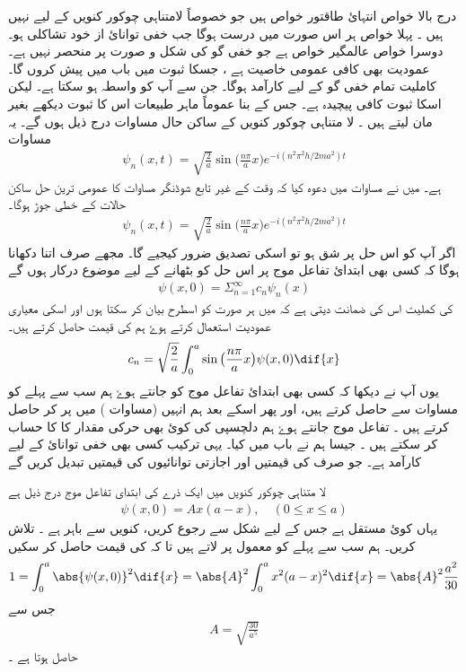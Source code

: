 درج بالا    خواص انتہائ طاقتور خواص ہیں جو خصوصاً لامتناہی چوکور کنویں کے لیے نہیں ہیں ۔ پہلا خواص ہر اس صورت میں درست ہوگا جب خفی توانائ از خود تشاکلی ہو۔ دوسرا خواص عالمگیر خواص ہے جو خفی گو کی شکل و صورت پر منحصر نہیں ہے۔ عمودیت بھی کافی عمومی خاصیت ہے ، جسکا ثبوت میں باب   میں پیش کروں گا۔  کاملیت تمام خفی گو کے لیے کارآمد ہوگا۔ جن سے آپ کو واسطہ ہو سکتا ہے۔ لیکن اسکا ثبوت کافی پیچیدہ ہے۔ جس کے بنا عموماً ماہر طبیعات اس کا ثبوت دیکھے بغیر مان لیتے ہیں ۔ لا متناہی چوکور کنویں کے ساکن حال مساوات   درج ذیل ہوں گے۔ یہ مساوات
 \begin{align}
\psi_{n}(x,t)=\sqrt{\frac{2}{a}}\sin\big(\frac{n\pi}{a}x\big)e^{-i(n^{2}\pi^{2}h/2ma^{2})t}
\end{align}
ہے۔ میں نے مساوات   میں دعوہ کیا کہ وقت کے غیر تابع شوڈنگر مساوات کا عمومی ترین حل ساکن حالات کے خطی جوڑ ہوگا۔
\begin{align}
\psi_{n}(x,t)=\sqrt{\frac{2}{a}}\sin\big(\frac{n\pi}{a}x\big)e^{-i(n^{2}\pi^{2}h/2ma^{2})t}
\end{align}  
 اگر آپ کو اس حل پر شق ہو تو اسکی تصدیق ضرور کیجیے گا۔ مجھے صرف اتنا دکھانا ہوگا کہ کسی بھی ابتدائ تفاعل موج    پر اس حل کو   بٹھانے کے لیے موضوع    درکار ہوں گے
\begin{align*}
\psi(x,0)=\Sigma_{n=1}^{\infty}c_{n}\psi_{n}(x)
\end{align*}
  کی کملیت اس کی ضمانت دیتی ہے کہ میں ہر صورت    کو اسطرح بیان کر سکتا ہوں اور اسکی معیاری عمودیت استعمال کرتے ہوۓ ہم    کی قیمت حاصل کرتے ہیں۔ 
\begin{align}
c_{n}=\sqrt{\frac{2}{a}}\int_{0}^{a}\sin\big(\frac{n\pi}{a}x\big)\psi(x,0)\dif{x}
\end{align}
یوں آپ نے دیکھا کہ کسی بھی ابتدائ تفاعل موج کو جانتے ہوۓ ہم سب سے پہلے  کو مساوات  سے حاصل کرتے ہیں،  اور پھر اسکے بعد ہم انہیں (مساوات  ) میں پر کر              حاصل کرتے ہیں ۔ تفاعل موج جانتے ہوۓ ہم دلچسپی کی کوئ بھی حرکی مقدار کا  کا حساب کر سکتے ہیں ۔ جیسا ہم نے باب  میں کیا۔ یہی ترکیب کسی بھی خفی توانائ کے لیے کارآمد ہے۔ جو صرف    کی  قیمتیں اور اجازتی توانائیوں کی قیمتیں تبدیل کریں گے

لا متناہی چوکور کنویں میں ایک ذرے کی ابتدای تفاعل موج درج ذیل ہے 
\begin{align*}
\psi(x,0)=Ax(a-x),\quad (0\le x\le  a)
\end{align*}
 یہاں    کوئ مستقل ہے جس کے لیے شکل   سے رجوع کریں، کنویں سے باہر   ہے ۔   تلاش کریں۔ 
ہم سب سے پہلے             کو معمول پر لاتے ہیں تا کہ        کی قیمت حاصل کر سکیں 
\begin{align*}
1=\int_{0}^{a}\abs{\psi(x,0)}^{2}\dif{x}=\abs{A}^{2}\int_{0}^{a}x^{2}(a-x)^{2}\dif{x}=\abs{A}^{2}\frac{a^{2}}{30}
\end{align*}
   جس سے
\begin{align*}
A=\sqrt{\frac{30}{a^{5}}}
\end{align*}
 حاصل ہوتا ہے ۔ 

